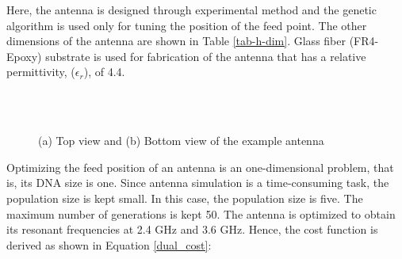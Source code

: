 Here, the antenna is designed through experimental method and the genetic algorithm is used only for tuning the position of the feed point. The other dimensions of the antenna are shown in Table \ref{tab-h-dim}. Glass fiber (FR4-Epoxy) substrate is used for fabrication of the antenna that has a relative permittivity, ($\epsilon_r$), of 4.4.
\begin{figure}[h]
\centering
{}\\
\\
\caption{(a) Top view and (b) Bottom view of the example antenna}\label{h-shaped-topology}
\end{figure}

\begin{table}[h]
\centering
\caption{Dimensions of the test antenna} \label{tab-h-dim}
\label{tab:my-table}
\end{table}

Optimizing the feed position of an antenna is an one-dimensional problem, that is, its DNA size is one. Since antenna simulation is a time-consuming task, the population size is kept small. In this case, the population size is five. The maximum number of generations is kept 50. The antenna is optimized to obtain its resonant frequencies at 2.4 GHz and 3.6 GHz. Hence, the cost function is derived as shown in Equation \ref{dual_cost}:

